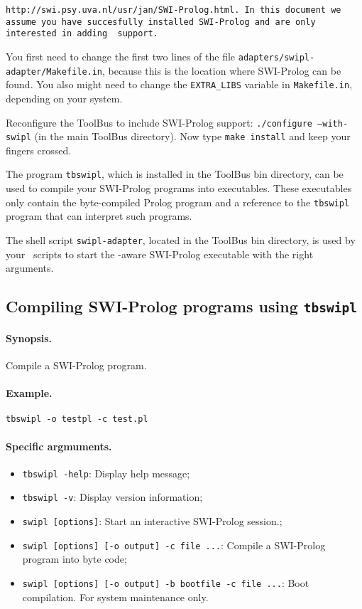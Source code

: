 {\tt http://swi.psy.uva.nl/usr/jan/SWI-Prolog.html. In this document
we assume you have succesfully installed SWI-Prolog and are only interested
in adding \TB\ support.

You first need to change the first two lines of the file 
{\tt adapters/swipl-adapter/Makefile.in}, because this is the location
where SWI-Prolog can be found. You also might need to change the
{\tt EXTRA\_LIBS} variable in {\tt Makefile.in}, depending on your 
system.

Reconfigure the ToolBus to include
SWI-Prolog support: {\tt ./configure --with-swipl} (in the main ToolBus
directory).
Now type {\tt make install} and keep your fingers crossed.

The program {\tt tbswipl}, which is installed in the ToolBus bin
directory, can be used to compile your SWI-Prolog programs into
executables. These executables only contain the byte-compiled Prolog
program and a reference to the {\tt tbswipl} program that can interpret
such programs.

The shell script {\tt swipl-adapter}, located in the ToolBus bin directory,
is used by your \TB\ scripts to start
the \TB -aware SWI-Prolog executable with the right arguments. 

\subsection{\label{compiling-swipl}Compiling SWI-Prolog programs using
{\tt tbswipl}}

\paragraph{Synopsis.} Compile a SWI-Prolog program.

\paragraph{Example.} {\tt tbswipl -o testpl -c test.pl}

\paragraph{Specific argmuments.}
\begin{itemize}
  \item {\tt tbswipl -help}: Display help message;
  \item {\tt tbswipl -v}:    Display version information;
  \item {\tt swipl [options]}: Start an interactive SWI-Prolog session.;
  \item {\tt swipl [options] [-o output] -c file ...}:
	Compile a SWI-Prolog program into byte code;
  \item {\tt swipl [options] [-o output] -b bootfile -c file ...}:
        Boot compilation. For system maintenance only.
\end{itemize}

}

